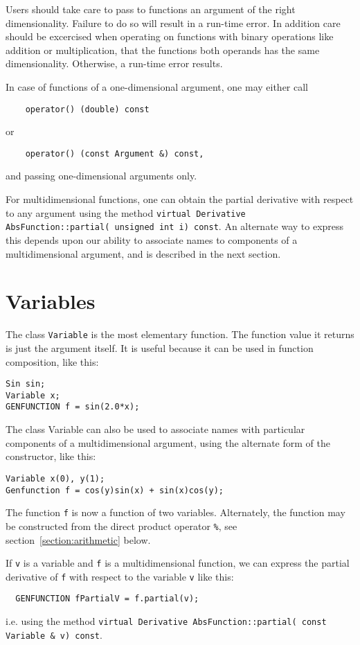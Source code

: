 \documentclass{report}
\begin{document}
\noindent Users should take care to pass to functions an argument of the right
dimensionality.  Failure to do so will result in a run-time error. 
In addition care should be excercised when operating on functions with
binary operations like addition or multiplication, that the functions
both operands has the same dimensionality. Otherwise, a run-time error
results.

\noindent In case of functions of a one-dimensional argument, one may either call 
\begin{verbatim}
	operator() (double) const 
\end{verbatim}
or
\begin{verbatim}	
	operator() (const Argument &) const,
\end{verbatim}
and passing one-dimensional arguments only.  

For multidimensional functions, one can obtain the partial derivative with respect
to any argument using the method \verb+virtual Derivative AbsFunction::partial( unsigned int i) const+. An alternate way to express this depends upon our ability to associate names 
to components of a multidimensional argument, and is described in the next section.

\section {Variables}

The class \verb+Variable+ is the most elementary function.  The function value it returns
is just the argument itself.  It is useful because it can be used in function composition,
like this:
\begin{verbatim}
Sin sin;
Variable x;
GENFUNCTION f = sin(2.0*x);
\end{verbatim}

The class Variable can also be used to associate names with particular components of a
multidimensional argument, using the alternate form of the constructor, like this:
\begin{verbatim}
Variable x(0), y(1);
Genfunction f = cos(y)sin(x) + sin(x)cos(y);
\end{verbatim}
The function \verb+f+ is now a function of two variables.  Alternately, the function may
be constructed from the direct product operator \verb+%+, see section~\ref{section:arithmetic}
below.

If \verb+v+ is a variable and \verb+f+ is a multidimensional function, we can express
the partial derivative of \verb+f+ with respect to the variable \verb+v+ like this:
\begin{verbatim}
  GENFUNCTION fPartialV = f.partial(v); 
\end{verbatim}
i.e. using the method \verb+virtual Derivative AbsFunction::partial( const Variable & v) const+.
\end{document}

